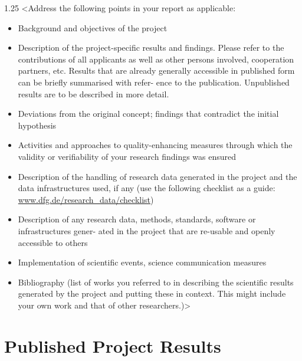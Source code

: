 \documentclass[a4paper, 11pt]{article}
\newenvironment{commentblock}{\begin{spacing}{1.25}\color{CommentColor}}{\end{spacing}\bigskip}
\newcommand{\tg}{\textgreater}
\newcommand{\tl}{\textless}
\begin{document}
\begin{commentblock}
\tl{}Address the following points in your report as applicable:

\begin{itemize}

\item Background and objectives of the project

\item Description of the project-specific results and findings. Please refer to the contributions of all applicants as well as other persons involved, cooperation partners, etc. Results that are already generally accessible in published form can be briefly summarised with refer- ence to the publication. Unpublished results are to be described in more detail.
  
\item Deviations from the original concept; findings that contradict the initial hypothesis
  
\item Activities and approaches to quality-enhancing measures through which the validity or verifiability of your research findings was ensured

\item Description of the handling of research data generated in the project and the data infrastructures used, if any (use the following checklist as a guide:
    \href{https://www.dfg.de/research\_data/checklist}{www.dfg.de/research\_data/checklist})

\item Description of any research data, methods, standards, software or infrastructures gener- ated in the project that are re-usable and openly accessible to others
    
\item Implementation of scientific events, science communication measures
  
\item Bibliography (list of works you referred to in describing the scientific results generated by the project and putting these in context. This might include your own work and that of other researchers.)\tg
  
\end{itemize}
\end{commentblock}


\section{Published Project Results}
\end{document}
